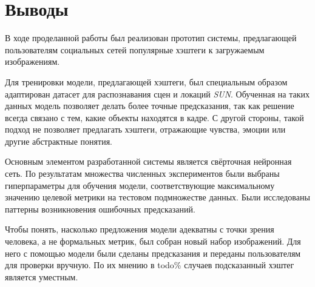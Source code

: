 \section*{Выводы}


\indent
\indent
\indent
В ходе проделанной работы был реализован прототип системы,
предлагающей пользователям социальных сетей популярные 
хэштеги к загружаемым изображениям.


\bigskip
\indent
\indent
Для тренировки модели, предлагающей хэштеги,
был специальным образом адаптирован датасет для распознавания
сцен и локаций \textit{SUN}. Обученная на таких данных модель
позволяет делать более точные предсказания, так как решение всегда связано
с тем, какие объекты находятся в кадре. С другой стороны,
такой подход не позволяет предлагать хэштеги, отражающие чувства, эмоции
или другие абстрактные понятия.


\bigskip
\indent
\indent
Основным элементом разработанной системы является свёрточная 
нейронная сеть. По результатам множества численных экспериментов
были выбраны гиперпараметры для обучения модели, 
соответствующие максимальному 
значению целевой метрики на тестовом подмножестве данных.
Были исследованы паттерны возникновения ошибочных предсказаний.


\bigskip
\indent
\indent
Чтобы понять, насколько предложения модели адекватны с точки зрения 
человека, а не формальных метрик, был собран новый набор изображений.
Для него с помощью модели были сделаны предсказания и переданы 
пользователям для проверки вручную. По их мнению в todo\% случаев 
подсказанный хэштег является уместным.
